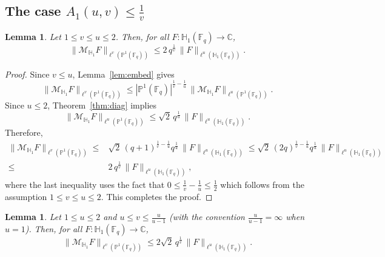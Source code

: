 \documentclass[11pt]{article}
\newtheorem{lemma}[theorem]{Lemma}
\newcommand{\1}{\mathbf 1}
\begin{document}
\subsection{The case $A_1(u, v)\le \frac{1}{v}$}

\begin{lemma}\label{thm:green}
Let $1\le v\le u\le 2$. Then, for all
$F:\mathbb{H}_1(\mathbb{F}_q)\to\mathbb{C}$, 
\[
\|\mathcal{M}_{\mathbb{H}_1} F\|_{\ell^v(\mathbb{P}^1(\mathbb{F}_q))}
\le 2 \,q^{\frac{1}{v}}\,
\|F\|_{\ell^u(\mathbb{H}_1(\mathbb{F}_q))}.
\]
\end{lemma}

\begin{proof}
Since $v\le u$, Lemma~\ref{lem:embed} gives
\[
\|\mathcal{M}_{\mathbb{H}_1} F\|_{\ell^v(\mathbb{P}^1(\mathbb{F}_q))}
\le
|\mathbb{P}^1(\mathbb{F}_q)|^{\frac1v-\frac1u}\,
\|\mathcal{M}_{\mathbb{H}_1} F\|_{\ell^u(\mathbb{P}^1(\mathbb{F}_q))}.
\]
Since $u\le 2$, Theorem~\ref{thm:diag} implies
\[
\|\mathcal{M}_{\mathbb{H}_1} F\|_{\ell^u(\mathbb{P}^1(\mathbb{F}_q))}
\le \sqrt{2} \,q^{\frac{1}{u}}\,
\|F\|_{\ell^u(\mathbb{H}_1(\mathbb{F}_q))}.
\]
Therefore,
\begin{align*}
    \|\mathcal{M}_{\mathbb{H}_1} F\|_{\ell^v(\mathbb{P}^1(\mathbb{F}_q))}
\le & \sqrt{2}\,(q+1)^{\frac1v-\frac1u}q^{\frac{1}{u}}\,\|F\|_{\ell^u(\mathbb{H}_1(\mathbb{F}_q))} \leq \sqrt{2}\,(2q)^{\frac1v-\frac1u}q^{\frac{1}{u}}\,\|F\|_{\ell^u(\mathbb{H}_1(\mathbb{F}_q))} \\
\le & 2\,q^{\frac{1}{v}}\,\|F\|_{\ell^u(\mathbb{H}_1(\mathbb{F}_q))},
\end{align*}
where the last inequality uses the fact that $0\leq \frac{1}{v}-\frac{1}{u} \leq \frac{1}{2}$ 
which follows from the assumption \(1 \le v \le u \le 2\).
This completes the proof.
\end{proof}




\begin{lemma}
\label{thm:lower-right-2}
Let $1\le u\le 2$ and $u\le v\le \frac{u}{u-1}$ (with the convention $\frac{u}{u-1}=\infty$ when $u=1$).  Then, for all
$F:\mathbb{H}_1(\mathbb{F}_q)\to\mathbb{C}$, 
\[
\|\mathcal{M}_{\mathbb{H}_1} F\|_{\ell^v(\mathbb{P}^1(\mathbb{F}_q))}
\le 2\sqrt{2}\,q^{\frac1v}\,
\|F\|_{\ell^u(\mathbb{H}_1(\mathbb{F}_q))}.
\]
\end{lemma}
\end{document}
